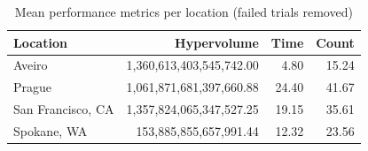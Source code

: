\begin{table}[h!]
    \centering
    \begin{tabular}{|l|r|r|r|}
        \hline
        \textbf{Location} & \textbf{Hypervolume} & \textbf{Time} & \textbf{Count} \\
        \hline
        Aveiro & 1,360,613,403,545,742.00 & 4.80 & 15.24 \\
        Prague & 1,061,871,681,397,660.88 & 24.40 & 41.67 \\
        San Francisco, CA & 1,357,824,065,347,527.25 & 19.15 & 35.61 \\
        Spokane, WA & 153,885,855,657,991.44 & 12.32 & 23.56 \\
        \hline
    \end{tabular}
    \caption{Mean performance metrics per location (failed trials removed)}
    \label{tab:location_metrics}
\end{table}